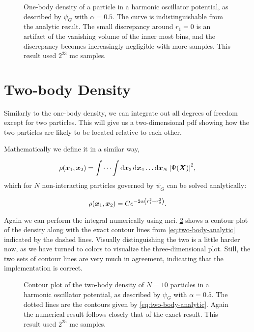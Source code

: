 \documentclass[Thesis.tex]{subfiles}
\begin{document}
\begin{figure}[h]
  \centering
  \resizebox{0.7\linewidth}{!}{%
    
  }
  \caption[One-body density of the ideal harmonic oscillator]{\label{fig:verify-onebody}One-body density of a particle in a
    harmonic oscillator potential, as described by $\psi_G$ with $\alpha=0.5$.
    The curve is indistinguishable from the analytic result. The small
    discrepancy around $r_1=0$ is an artifact of the vanishing volume of the
    inner most bins, and the discrepancy becomes increasingly negligible with
    more samples. This result used $2^{23}$ \gls{mc} samples.}
\end{figure}

\section{Two-body Density}

Similarly to the one-body density, we can integrate out all degrees of freedom
except for two particles. This will give us a two-dimensional \gls{pdf} showing
how the two particles are likely to be located relative to each other.

Mathematically we define it in a similar way,

\begin{align}
  \label{eq:two-body-density-def}
  \rho(\bm{x}_1, \bm{x}_2) = \idotsint \dd{\bm{x}_3}\dd{\bm{x}_4}\dots\dd{\bm{x}_N} \abs{\Psi(\bm{X})}^2,
\end{align}
which for $N$ non-interacting particles governed by $\psi_G$ can be solved
analytically:

\begin{align}
  \label{eq:two-body-analytic}
  \rho(\bm{x}_1, \bm{x}_2) = Ce^{-2\alpha\qty(r_1^2 + r_2^2)}.
\end{align}

Again we can perform the integral numerically using \gls{mci}.
\cref{fig:verify-twobody} shows a contour plot of the density along with the
exact contour lines from \cref{eq:two-body-analytic} indicated by the dashed
lines. Visually distinguishing the two is a little harder now, as we have turned
to colors to visualize the three-dimensional plot. Still, the two sets of
contour lines are very much in agreement, indicating that the implementation is
correct.

\begin{figure}[h]
  \centering
  \resizebox{0.7\linewidth}{!}{%
    
  }
  \caption[Two-body density of the ideal harmonic oscillator]{\label{fig:verify-twobody}Contour plot of the two-body density of
$N=10$ particles in a harmonic oscillator potential, as described by $\psi_G$
with $\alpha=0.5$. The dotted lines are the contours given by
\cref{eq:two-body-analytic}. Again the numerical result follows closely that of
the exact result. This result used $2^{25}$ \gls{mc} samples.}
\end{figure}
\end{document}
